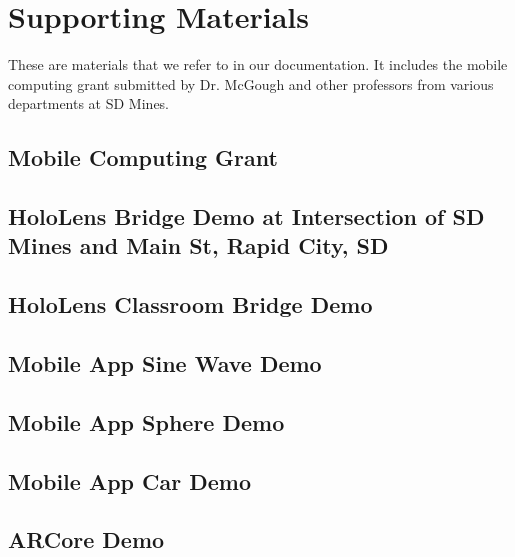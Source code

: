 \chapter{Supporting Materials}
\label{ch:support}

These are materials that we refer to in our documentation. It includes the 
mobile computing grant submitted by Dr. McGough and other professors from 
various departments at SD Mines.


\section{Mobile Computing Grant}
\label{F:F-1}

\section{HoloLens Bridge Demo at Intersection of SD Mines and Main St, Rapid City, SD}


\section{HoloLens Classroom Bridge Demo}



\section{Mobile App Sine Wave Demo}


\section{Mobile App Sphere Demo}


\section{Mobile App Car Demo}


\section{ARCore Demo}







 